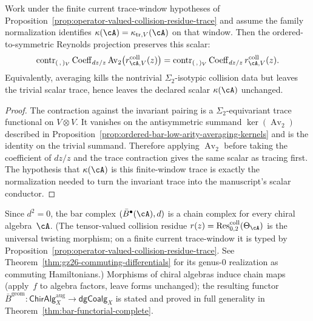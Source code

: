 \begin{corollary}
\label{cor:averaging-preserves-scalar-kappa}
Work under the finite current trace-window hypotheses of
Proposition~\ref{prop:operator-valued-collision-residue-trace} and
assume the family normalization identifies
$\kappa(\cA)=\kappa_{\mathrm{tr},V}(\cA)$ on that window. Then the
ordered-to-symmetric Reynolds projection preserves this scalar:
\[
\operatorname{contr}_{(\,,\,)_V}
\operatorname{Coeff}_{dz/z}
\operatorname{Av}_2
\bigl(r^{\mathrm{coll}}_{\cA,V}(z)\bigr)
=
\operatorname{contr}_{(\,,\,)_V}
\operatorname{Coeff}_{dz/z}
r^{\mathrm{coll}}_{\cA,V}(z).
\]
Equivalently, averaging kills the nontrivial $\Sigma_2$-isotypic
collision data but leaves the trivial scalar trace, hence leaves the
declared scalar $\kappa(\cA)$ unchanged.
\end{corollary}

\begin{proof}
The contraction against the invariant pairing is a
$\Sigma_2$-equivariant trace functional on $V\otimes V$. It vanishes on
the antisymmetric summand
$\ker(\operatorname{Av}_2)$ described in
Proposition~\ref{prop:ordered-bar-low-arity-averaging-kernels} and is
the identity on the trivial summand. Therefore applying
$\operatorname{Av}_2$ before taking the coefficient of $dz/z$ and the
trace contraction gives the same scalar as tracing first. The
hypothesis that $\kappa(\cA)$ is this finite-window trace is exactly the
normalization needed to turn the invariant trace into the manuscript's
scalar conductor.
\end{proof}

\begin{corollary}\label{cor:bar-functorial}
Since $d^2 = 0$, the bar complex
$(\bar{B}^{\bullet}(\cA), d)$ is a chain complex for every
chiral algebra~$\cA$.
(The tensor-valued collision residue
$r(z)=\operatorname{Res}^{\mathrm{coll}}_{0,2}(\Theta_\cA)$ is the
universal twisting morphism; on a finite current trace-window it is
typed by Proposition~\ref{prop:operator-valued-collision-residue-trace}.
See Theorem~\ref{thm:gz26-commuting-differentials} for its genus-$0$
realization as commuting Hamiltonians.) Morphisms of chiral algebras induce
chain maps (apply~$f$ to algebra factors, leave forms
unchanged); the resulting functor
$\bar{B}^{\mathrm{geom}} \colon
\mathsf{ChirAlg}_X^{\mathrm{aug}} \to
\mathsf{dgCoalg}_X$
is stated and proved in full generality in
Theorem~\ref{thm:bar-functorial-complete}.
\end{corollary}

